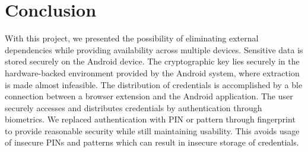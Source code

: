 \section{Conclusion} \label{conclusion}
With this project, we presented the possibility of eliminating external dependencies while providing availability across multiple devices. Sensitive data is stored securely on the Android device. The cryptographic key lies securely in the hardware-backed environment provided by the Android system, where extraction is made almost infeasible. The distribution of credentials is accomplished by a \gls{ble} connection between a browser extension and the Android application. The user securely accesses and distributes credentials by authentication through biometrics. We replaced authentication with PIN or pattern through fingerprint to provide reasonable security while still maintaining usability. This avoids usage of insecure PINs and patterns which can result in insecure storage of credentials.
